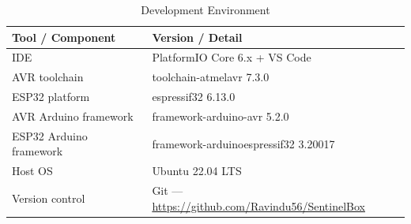 \documentclass[12pt,a4paper]{article}
\begin{document}
\begin{table}[H]
\centering
\begin{tabular}{@{} L{4cm} L{9cm} @{}}
\toprule
\textbf{Tool / Component}  & \textbf{Version / Detail}                              \\
\midrule
IDE                        & PlatformIO Core 6.x + VS Code                         \\
AVR toolchain              & toolchain-atmelavr 7.3.0                               \\
ESP32 platform             & espressif32 6.13.0                                     \\
AVR Arduino framework      & framework-arduino-avr 5.2.0                            \\
ESP32 Arduino framework    & framework-arduinoespressif32 3.20017                   \\
Host OS                    & Ubuntu 22.04 LTS                                       \\
Version control            & Git --- \url{https://github.com/Ravindu56/SentinelBox}  \\
\bottomrule
\end{tabular}
\caption{Development Environment}
\end{table}
\end{document}
